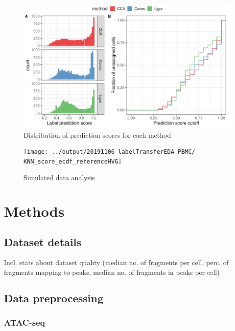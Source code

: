 \documentclass[]{article}
\begin{document}
\begin{figure}
\centering
\includegraphics{../output/20191106_labelTransferEDA_PBMC/prediction_score_distribution.pdf}
\caption{Distribution of prediction scores for each method}
\end{figure}

\begin{figure}
\texttt{[image: ../output/20191106\_labelTransferEDA\_PBMC/ KNN\_score\_ecdf\_referenceHVG]} \caption{Simulated data analysis}\label{fig:simdata}
\end{figure}

\hypertarget{methods}{%
\section{Methods}\label{methods}}

\hypertarget{dataset-details}{%
\subsection{Dataset details}\label{dataset-details}}

Incl. stats about dataset quality (median no. of fragments per cell,
perc. of fragments mapping to peaks, median no. of fragments in peaks
per cell)

\hypertarget{data-preprocessing}{%
\subsection{Data preprocessing}\label{data-preprocessing}}

\hypertarget{atac-seq}{%
\subsubsection{ATAC-seq}\label{atac-seq}}
\end{document}

